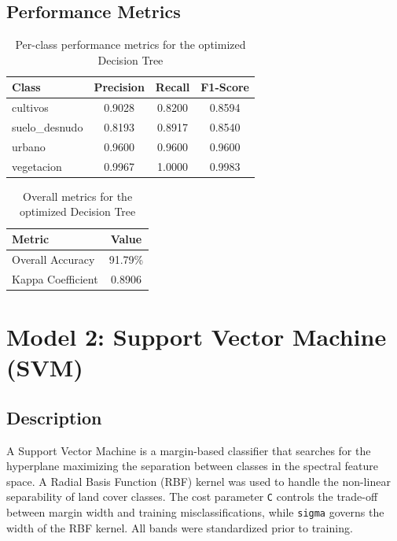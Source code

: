\documentclass[12pt,a4paper]{article}
\begin{document}
\subsection{Performance Metrics}

\begin{table}[H]
\centering
\begin{tabular}{|m{4cm}|c|c|c|}
\hline
\textbf{Class} & \textbf{Precision} & \textbf{Recall} & \textbf{F1-Score} \\
\hline
cultivos       & 0.9028 & 0.8200 & 0.8594 \\
\hline
suelo\_desnudo & 0.8193 & 0.8917 & 0.8540 \\
\hline
urbano         & 0.9600 & 0.9600 & 0.9600 \\
\hline
vegetacion     & 0.9967 & 1.0000 & 0.9983 \\
\hline
\end{tabular}
\caption{Per-class performance metrics for the optimized Decision Tree}
\end{table}

\begin{table}[H]
\centering
\begin{tabular}{|m{5cm}|c|}
\hline
\textbf{Metric} & \textbf{Value} \\
\hline
Overall Accuracy  & 91.79\% \\
\hline
Kappa Coefficient & 0.8906 \\
\hline
\end{tabular}
\caption{Overall metrics for the optimized Decision Tree}
\end{table}

\section{Model 2: Support Vector Machine (SVM)}

\subsection{Description}

A Support Vector Machine is a margin-based classifier that searches for the hyperplane maximizing the separation between classes in the spectral feature space. A Radial Basis Function (RBF) kernel was used to handle the non-linear separability of land cover classes. The cost parameter \texttt{C} controls the trade-off between margin width and training misclassifications, while \texttt{sigma} governs the width of the RBF kernel. All bands were standardized prior to training.
\end{document}
